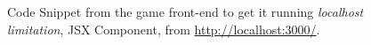 



\begin{figure}[h]
\centering 


\caption[Game.jsx Sample Code]{Code Snippet from the game front-end to get it running 
\emph{localhost limitation}, JSX Component, 
from \url{http://localhost:3000/}.} %
\label{fig:snippet} 
\end{figure}
